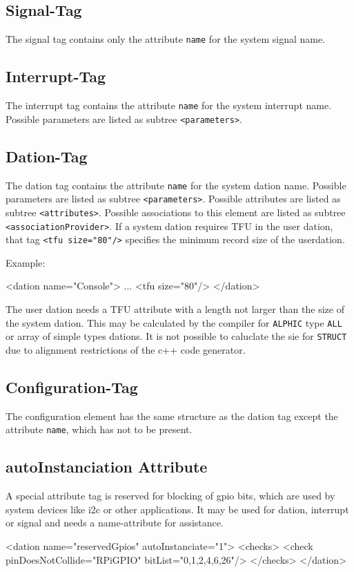 \subsection{Signal-Tag}
The signal tag contains only the attribute \verb|name| for the
system signal name.

\subsection{Interrupt-Tag}
The interrupt tag contains the attribute \verb|name| for the
system interrupt name.
Possible parameters are listed as subtree \verb|<parameters>|.

\subsection{Dation-Tag}
The dation tag contains the attribute \verb|name| for the
system dation name.
Possible parameters are listed as subtree \verb|<parameters>|.
Possible attributes are listed as subtree \verb|<attributes>|.
Possible associations to this element are
 listed as subtree \verb|<associationProvider>|.
If a system dation requires TFU in the user dation, that tag
\verb|<tfu size="80"/>| specifies the minimum record size of the 
userdation.

Example:
\begin{XMLCode}
<dation name="Console">
...
<tfu size="80"/>
</dation>
\end{XMLCode}

The user dation needs a TFU attribute with a length not larger than the 
size of the system dation. This may be calculated by the compiler for \texttt{ALPHIC} 
type \texttt{ALL} or array of simple types dations.
It is not possible to caluclate the sie for \texttt{STRUCT}
 due to alignment restrictions of the c++ code generator.


\subsection{Configuration-Tag}
The configuration element has the same structure as the dation tag
except the attribute \verb|name|, which has not to be present.

\subsection{autoInstanciation Attribute}
A special attribute tag is reserved for
blocking of gpio bits, which are used by system devices like i2c or 
other applications. It may be used for dation, interrupt or signal and 
needs a name-attribute for assistance.
\begin{XMLCode}
<dation name="reservedGpios" autoInstanciate="1">
  <checks>
    <check pinDoesNotCollide="RPiGPIO" bitList="0,1,2,4,6,26"/>
  </checks>
</dation>
\end{XMLCode}

